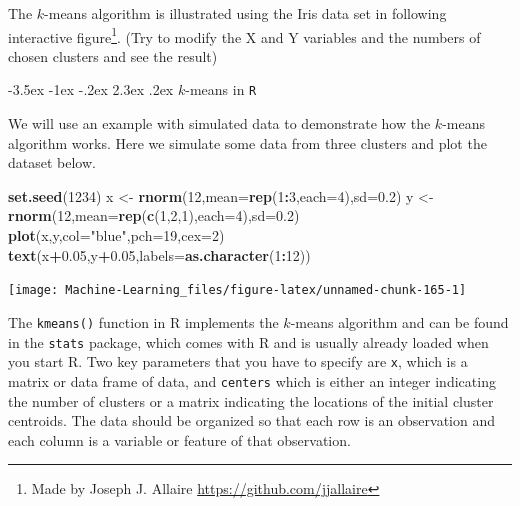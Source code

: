 \documentclass[]{book}
\makeatletter
\newenvironment{Shaded}{\begin{snugshade}}{\end{snugshade}}
\newcommand{\KeywordTok}[1]{\textcolor[rgb]{0.13,0.29,0.53}{\textbf{#1}}}
\newcommand{\DataTypeTok}[1]{\textcolor[rgb]{0.13,0.29,0.53}{#1}}
\newcommand{\DecValTok}[1]{\textcolor[rgb]{0.00,0.00,0.81}{#1}}
\newcommand{\FloatTok}[1]{\textcolor[rgb]{0.00,0.00,0.81}{#1}}
\newcommand{\StringTok}[1]{\textcolor[rgb]{0.31,0.60,0.02}{#1}}
\newcommand{\OperatorTok}[1]{\textcolor[rgb]{0.81,0.36,0.00}{\textbf{#1}}}
\newcommand{\NormalTok}[1]{#1}
\let\rmarkdownfootnote\footnote%
\def\footnote{\protect\rmarkdownfootnote}
\let\origfigure\figure
\let\endorigfigure\endfigure
\renewenvironment{figure}[1][2] {
    \expandafter\origfigure\expandafter[H]
} {
    \endorigfigure
}
\renewcommand\section{\@startsection {section}{1}{\z@}%
                                   {-3.5ex \@plus -1ex \@minus -.2ex}%
                                   {2.3ex \@plus.2ex}%
                                   {\normalfont\Large\bfseries\color{ForestGreen}}}
\theoremstyle{definition}
\theoremstyle{definition}
\theoremstyle{definition}
\theoremstyle{remark}
\makeatother
\begin{document}
The \(k\)-means algorithm is illustrated using the Iris data set in
following interactive figure\footnote{Made by Joseph J. Allaire
  \url{https://github.com/jjallaire}}. (Try to modify the X and Y
variables and the numbers of chosen clusters and see the result)

\section{\texorpdfstring{\(k\)-means in
\texttt{R}}{k-means in R}}\label{k-means-in-r}

We will use an example with simulated data to demonstrate how the
\(k\)-means algorithm works. Here we simulate some data from three
clusters and plot the dataset below.

\begin{Shaded}
\begin{Highlighting}[]
\KeywordTok{set.seed}\NormalTok{(}\DecValTok{1234}\NormalTok{)}
\NormalTok{x <-}\StringTok{ }\KeywordTok{rnorm}\NormalTok{(}\DecValTok{12}\NormalTok{,}\DataTypeTok{mean=}\KeywordTok{rep}\NormalTok{(}\DecValTok{1}\OperatorTok{:}\DecValTok{3}\NormalTok{,}\DataTypeTok{each=}\DecValTok{4}\NormalTok{),}\DataTypeTok{sd=}\FloatTok{0.2}\NormalTok{)}
\NormalTok{y <-}\StringTok{ }\KeywordTok{rnorm}\NormalTok{(}\DecValTok{12}\NormalTok{,}\DataTypeTok{mean=}\KeywordTok{rep}\NormalTok{(}\KeywordTok{c}\NormalTok{(}\DecValTok{1}\NormalTok{,}\DecValTok{2}\NormalTok{,}\DecValTok{1}\NormalTok{),}\DataTypeTok{each=}\DecValTok{4}\NormalTok{),}\DataTypeTok{sd=}\FloatTok{0.2}\NormalTok{)}
\KeywordTok{plot}\NormalTok{(x,y,}\DataTypeTok{col=}\StringTok{"blue"}\NormalTok{,}\DataTypeTok{pch=}\DecValTok{19}\NormalTok{,}\DataTypeTok{cex=}\DecValTok{2}\NormalTok{)}
\KeywordTok{text}\NormalTok{(x}\OperatorTok{+}\FloatTok{0.05}\NormalTok{,y}\OperatorTok{+}\FloatTok{0.05}\NormalTok{,}\DataTypeTok{labels=}\KeywordTok{as.character}\NormalTok{(}\DecValTok{1}\OperatorTok{:}\DecValTok{12}\NormalTok{))}
\end{Highlighting}
\end{Shaded}

\begin{figure}

{\centering \texttt{[image: Machine-Learning\_files/figure-latex/unnamed-chunk-165-1]} 

}

\caption{Simulated dataset}\label{fig:unnamed-chunk-165}
\end{figure}

The \texttt{kmeans()} function in R implements the \(k\)-means algorithm
and can be found in the \texttt{stats} package, which comes with R and
is usually already loaded when you start R. Two key parameters that you
have to specify are \texttt{x}, which is a matrix or data frame of data,
and \texttt{centers} which is either an integer indicating the number of
clusters or a matrix indicating the locations of the initial cluster
centroids. The data should be organized so that each row is an
observation and each column is a variable or feature of that
observation.
\end{document}
